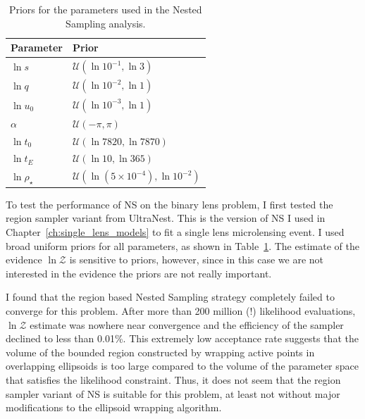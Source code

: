 \documentclass[12pt,dvipsnames]{report}
\newcommand{\ssf}[1]{\textsf{#1}}
\begin{document}
\begin{table}[h!]
\centering
\begin{tabular}{ll}
 \toprule
 Parameter & Prior\\
    \midrule
    $\ln s$ & $\mathcal{U}(\ln 10^{-1}, \ln 3)$\\
    $\ln q$ & $\mathcal{U}(\ln 10^{-2}, \ln 1)$\\
    $\ln u_0$ & $\mathcal{U}(\ln 10^{-3}, \ln 1)$\\
    $\alpha$ & $\mathcal{U}(-\pi, \pi)$\\
    $\ln t_0$ & $\mathcal{U}(\ln 7820, \ln 7870)$\\
    $\ln t_E$ & $\mathcal{U}(\ln 10, \ln 365)$\\
    $\ln \rho_\star$ & $\mathcal{U}(\ln (5\times 10^{-4}), \ln 10^{-2})$\\
    \bottomrule
\end{tabular}
\caption{Priors for the parameters used in the Nested Sampling analysis.}
\label{tab:priors_ns}
\end{table}


To test the performance of NS on the binary lens problem, I first tested the region 
sampler variant from \ssf{UltraNest}. This is the version of NS I used 
in Chapter~\ref{ch:single_lens_models} to fit a single lens microlensing event. 
I used broad uniform priors for all parameters, as shown in Table~\ref{tab:priors_ns}.
The estimate of the evidence
$\ln\mathcal{Z}$ is sensitive to priors, however, since in this case we are not interested in the evidence 
the priors are not really important.

I found that the region based Nested Sampling strategy completely failed to converge 
for this problem. After more than 200 million (!) likelihood evaluations,  $\ln\mathcal{Z}$ estimate
was nowhere near convergence and the efficiency of the sampler declined to less than 0.01\%.
This extremely low acceptance rate suggests that the volume of the bounded region constructed by wrapping 
active points in overlapping ellipsoids is too large compared to the volume of the parameter space 
that satisfies the likelihood constraint.
Thus, it does not seem that the region sampler variant of NS is suitable for this problem,
at least not without major modifications to the ellipsoid wrapping algorithm.
\end{document}
